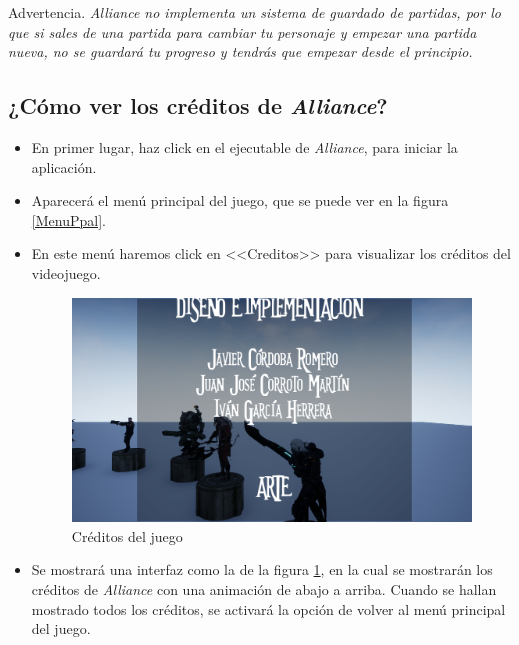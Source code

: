 \renewcommand\bcStyleTitre[1]{\large\hspace*{1.8in}\textcolor{red!100}{#1}}
\begin{bclogo}[
  couleur=red!15,
  arrondi=0.25,
  logo=\hspace*{1in}\bctakecare,
  barre=none,
  noborder=true]{\hspace*{0.15in} Advertencia.}
\itshape \vspace*{0.15in}
\textit{Alliance} no implementa un sistema de guardado de partidas, por lo que si sales de una partida para cambiar tu personaje y empezar una partida nueva, no se guardará tu progreso y tendrás que empezar desde el principio.
\end{bclogo}


\subsection{¿Cómo ver los créditos de \textit{Alliance}?}
\begin{itemize}
\item En primer lugar, haz click en el ejecutable de \textit{Alliance}, para iniciar la aplicación.
\item Aparecerá el menú principal del juego, que se puede ver en la figura \ref{MenuPpal}.
\item En este menú haremos click en <<Creditos>> para visualizar los créditos del videojuego.

\begin{figure}[H]
  \centering
  \includegraphics[width=12cm]{./images/Creditos.png}
  \caption{Créditos del juego}
  \label{Creditos}
\end{figure}

\item Se mostrará una interfaz como la de la figura \ref{Creditos}, en la cual se mostrarán los créditos de \textit{Alliance} con una animación de abajo a arriba. Cuando se hallan mostrado todos los créditos, se activará la opción de volver al menú principal del juego.
\end{itemize}
